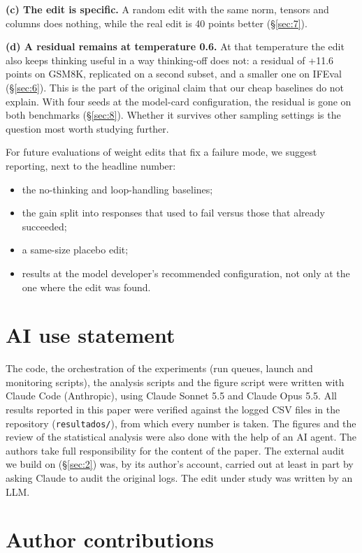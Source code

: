 \documentclass[11pt]{article}
\begin{document}
\textbf{(c) The edit is specific.} A random edit with the same norm, tensors and columns does nothing, while the real edit is 40 points better (\S\ref{sec:7}).

\textbf{(d) A residual remains at temperature 0.6.} At that temperature the edit also keeps thinking useful in a way thinking-off does not: a residual of +11.6 points on GSM8K, replicated on a second subset, and a smaller one on IFEval (\S\ref{sec:6}). This is the part of the original claim that our cheap baselines do not explain. With four seeds at the model-card configuration, the residual is gone on both benchmarks (\S\ref{sec:8}). Whether it survives other sampling settings is the question most worth studying further.

For future evaluations of weight edits that fix a failure mode, we suggest reporting, next to the headline number:

\begin{itemize}[nosep,leftmargin=*]
\item the no-thinking and loop-handling baselines;
\item the gain split into responses that used to fail versus those that already succeeded;
\item a same-size placebo edit;
\item results at the model developer's recommended configuration, not only at the one where the edit was found.
\end{itemize}

\section{AI use statement}\label{sec:14}

The code, the orchestration of the experiments (run queues, launch and monitoring scripts), the analysis scripts and the figure script were written with Claude Code (Anthropic), using Claude Sonnet 5.5 and Claude Opus 5.5. All results reported in this paper were verified against the logged CSV files in the repository (\texttt{resultados/}), from which every number is taken. The figures and the review of the statistical analysis were also done with the help of an AI agent. The authors take full responsibility for the content of the paper. The external audit we build on (\S\ref{sec:2}) was, by its author's account, carried out at least in part by asking Claude to audit the original logs. The edit under study was written by an LLM.

\section*{Author contributions}
\end{document}
